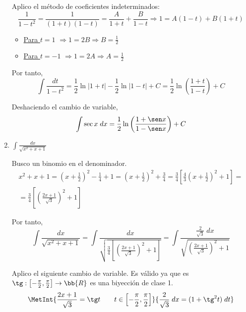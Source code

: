 \begin{ejercicio}
\begin{enumerate}
    Aplico el método de coeficientes indeterminados:
    \begin{equation*}
        \frac{1}{1-t^2} = \frac{1}{(1+t)(1-t)} = \frac{A}{1+t}+\frac{B}{1-t} \Longrightarrow 1=A(1-t)+B(1+t)
    \end{equation*}
    \begin{itemize}
        \item \underline{Para $t=1$} $\Longrightarrow 1=2B \Longrightarrow B=\frac{1}{2}$
        \item \underline{Para $t=-1$} $\Longrightarrow 1=2A \Longrightarrow A=\frac{1}{2}$
    \end{itemize}

    Por tanto,
    \begin{equation*}
        \int \frac{dt}{1-t^2} = \frac{1}{2}\ln |1+t|-\frac{1}{2}\ln |1-t| +C
        = \frac{1}{2}\ln \left(\frac{1+t}{1-t}\right)+C
    \end{equation*}

    Deshaciendo el cambio de variable,
    \begin{equation*}
        \int \sec x \;dx = \frac{1}{2}\ln \left(\frac{1+\sen x}{1-\sen x}\right)+C
    \end{equation*}

    \item $\displaystyle \int \frac{dx}{\sqrt{x^2+x+1}}$

    Busco un binomio en el denominador.
    \begin{multline*}
        x^2 + x +1 = \left(x+\frac{1}{2}\right)^2 -\frac{1}{4}+1 = \left(x+\frac{1}{2}\right)^2 +\frac{3}{4}
        = \frac{3}{4}\left[\frac{4}{3}\left(x+\frac{1}{2}\right)^2 +1\right]
        =\\= \frac{3}{4}\left[\left(\frac{2x+1}{\sqrt{3}}\right)^2 +1\right]
    \end{multline*}

    Por tanto,
    \begin{equation*}
        \int \frac{dx}{\sqrt{x^2+x+1}}
        = \int \frac{dx}{\sqrt{\frac{3}{4}\left[\left(\frac{2x+1}{\sqrt{3}}\right)^2 +1\right]}}
        = \int \frac{\frac{2}{\sqrt{3}}\;dx}{\sqrt{\left(\frac{2x+1}{\sqrt{3}}\right)^2 +1}}
    \end{equation*}

    Aplico el siguiente cambio de variable. Es válido ya que es $\tg:\left[-\frac{\pi}{2},\frac{\pi}{2}\right]\to \bb{R}$ es una biyección de clase 1.
   \begin{equation*}
        \MetInt{\frac{2x+1}{\sqrt{3}}=\tg t\qquad t\in\left[-\frac{\pi}{2},\frac{\pi}{2}\right]}{\frac{2}{\sqrt{3}}\;dx = (1+\tg^2 t)\;dt}
   \end{equation*} 


\end{enumerate}
\end{ejercicio}
